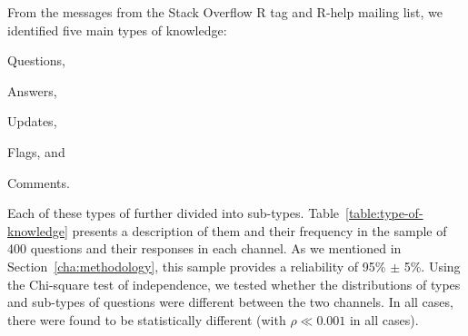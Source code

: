 From the messages from the Stack Overflow R tag and R-help mailing list,  we identified five main types of knowledge:
\begin{enumerate*}[label=(\arabic*)]
\item Questions,
\item Answers,
\item Updates,
\item Flags, and
\item Comments.
\end{enumerate*}
Each of these types of further divided into sub-types. Table~\ref{table:type-of-knowledge} presents a description of them and their frequency in the sample of
400 questions and their responses in each channel. As we mentioned in Section~\ref{cha:methodology}, this sample provides a reliability of 95\% $\pm$ 5\%. Using
the Chi-square test of independence, we tested whether the distributions of types and sub-types of questions were different between the two channels.  In
all cases, there were found to be statistically different (with $\rho \ll 0.001$ in all cases).
